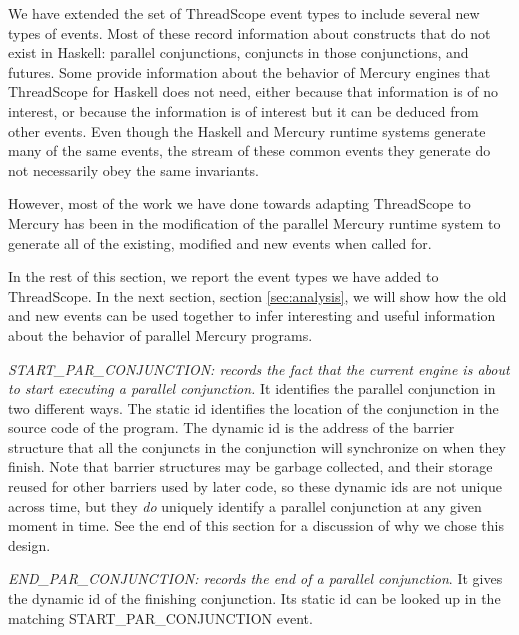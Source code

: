 
We have extended the set of ThreadScope event types
to include several new types of events.
Most of these record information about constructs that do not exist in Haskell:
parallel conjunctions, conjuncts in those conjunctions, and futures.
Some provide information about the behavior of Mercury engines
that ThreadScope for Haskell does not need,
either because that information is of no interest,
or because the information is of interest
but it can be deduced from other events.
Even though the Haskell and Mercury runtime systems
generate many of the same events,
the stream of these common events they generate
do not necessarily obey the same invariants.

However, most of the work we have done towards adapting ThreadScope to Mercury
has been in the modification of the parallel Mercury runtime system
to generate all of the existing, modified and new events when called for.

In the rest of this section,
we report the event types we have added to ThreadScope.
In the next section, section \ref{sec:analysis},
we will show how the old and new events can be used together
to infer interesting and useful information
about the behavior of parallel Mercury programs.


\emph{START\_PAR\_CONJUNCTION: records the fact that
the current engine is about to start executing a parallel conjunction.}
It identifies the parallel conjunction in two different ways.
The static id identifies
the location of the conjunction in the source code of the program.
The dynamic id is the address of the barrier structure
that all the conjuncts in the conjunction will synchronize on when they finish.
Note that barrier structures may be garbage collected,
and their storage reused for other barriers used by later code,
so these dynamic ids are not unique across time,
but they \emph{do} uniquely identify a parallel conjunction
at any given moment in time.
See the end of this section for a discussion of why we chose this design.

\emph{END\_PAR\_CONJUNCTION:
records the end of a parallel conjunction}.
It gives the dynamic id of the finishing conjunction.
Its static id can be looked up in the matching START\_PAR\_CONJUNCTION event.

